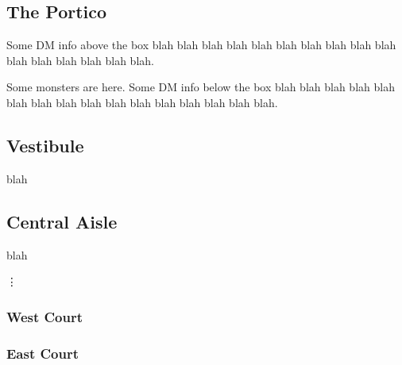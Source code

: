 \documentclass[a4paper,serif]{module}       %
\begin{document}

\subsection{The Portico}                                                        %
\label{portico}

Some DM info above the box blah blah blah blah blah blah blah blah blah blah blah blah blah blah blah blah.



Some monsters are here.
Some DM info below the box blah blah blah blah blah blah blah blah blah blah blah blah blah blah blah blah.

\subsection{Vestibule}                                                          %


blah

\subsection{Central Aisle}                                                      %


blah

\vdots                                                                          %

\setcounter{subsection}{7}
\subsubsection{West Court}                                                      %
\label{west_court}

\subsubsection{East Court}                                                      %
\end{document}

